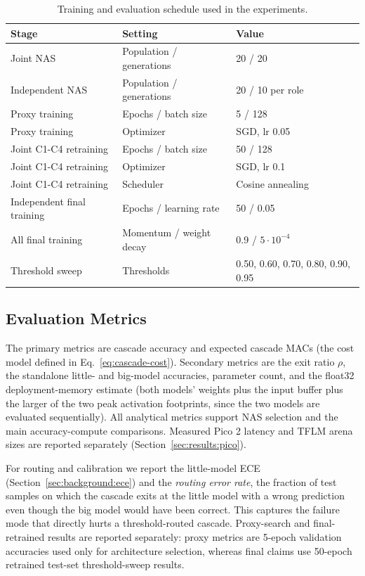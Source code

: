 \documentclass[conference]{IEEEtran}
\begin{document}
\begin{table}[t]
\centering
\caption{Training and evaluation schedule used in the experiments.}
\label{tab:experimental-schedule}
\small
\begin{tabular}{@{}p{}p{}p{}@{}}
\toprule
\textbf{Stage} & \textbf{Setting} & \textbf{Value} \\
\midrule
Joint NAS & Population / generations & 20 / 20 \\
Independent NAS & Population / generations & 20 / 10 per role \\
Proxy training & Epochs / batch size & 5 / 128 \\
Proxy training & Optimizer & SGD, lr 0.05 \\
Joint C1-C4 retraining & Epochs / batch size & 50 / 128 \\
Joint C1-C4 retraining & Optimizer & SGD, lr 0.1 \\
Joint C1-C4 retraining & Scheduler & Cosine annealing \cite{loshchilov2017sgdr} \\
Independent final training & Epochs / learning rate & 50 / 0.05 \\
All final training & Momentum / weight decay & 0.9 / $5\cdot10^{-4}$ \\
Threshold sweep & Thresholds & 0.50, 0.60, 0.70, 0.80, 0.90, 0.95 \\
\bottomrule
\end{tabular}
\end{table}

\subsection{Evaluation Metrics}

The primary metrics are cascade accuracy and expected cascade MACs (the cost
model defined in Eq.~\ref{eq:cascade-cost}). Secondary metrics are the exit
ratio $\rho$, the standalone little- and big-model accuracies, parameter
count, and the float32 deployment-memory estimate (both models' weights plus
the input buffer plus the larger of the two peak activation footprints,
since the two models are evaluated sequentially). All analytical metrics
support NAS selection and the main accuracy-compute comparisons.
Measured Pico 2 latency and TFLM arena sizes are reported separately
(Section~\ref{sec:results:pico}).

For routing and calibration we report the little-model ECE
(Section~\ref{sec:background:ece}) and the \emph{routing error rate}, the
fraction of test samples on which the cascade exits at the little model with
a wrong prediction even though the big model would have been correct. This
captures the failure mode that directly hurts a threshold-routed cascade.
Proxy-search and final-retrained results are reported separately: proxy
metrics are 5-epoch validation accuracies used only for architecture
selection, whereas final claims use 50-epoch retrained test-set
threshold-sweep results.
\end{document}
